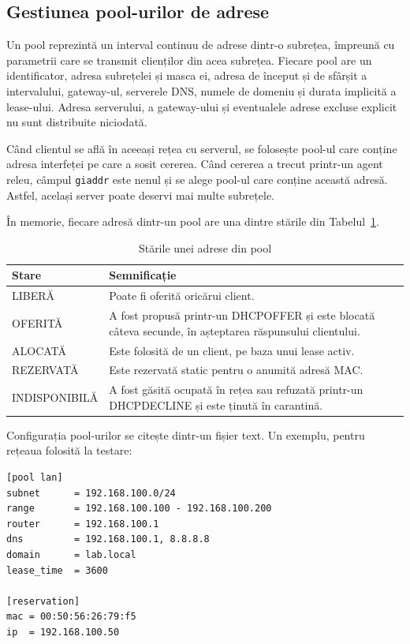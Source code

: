 \documentclass[conference]{IEEEtran}
\begin{document}
\subsection{Gestiunea pool-urilor de adrese}\label{subsec:pool}
Un pool reprezintă un interval continuu de adrese dintr-o subrețea, împreună cu parametrii care se transmit clienților din acea subrețea. Fiecare pool are un identificator, adresa subrețelei și masca ei, adresa de început și de sfârșit a intervalului, gateway-ul, serverele DNS, numele de domeniu și durata implicită a lease-ului. Adresa serverului, a gateway-ului și eventualele adrese excluse explicit nu sunt distribuite niciodată.

Când clientul se află în aceeași rețea cu serverul, se folosește pool-ul care conține adresa interfeței pe care a sosit cererea. Când cererea a trecut printr-un agent releu, câmpul \texttt{giaddr} este nenul și se alege pool-ul care conține această adresă. Astfel, același server poate deservi mai multe subrețele.

În memorie, fiecare adresă dintr-un pool are una dintre stările din Tabelul~\ref{tab:stari}.

\begin{table}[htbp]
\caption{Stările unei adrese din pool}
\begin{center}
\begin{tabular}{|l|p{5.2cm}|}
\hline
\textbf{Stare} & \textbf{Semnificație} \\
\hline
LIBERĂ & Poate fi oferită oricărui client. \\
\hline
OFERITĂ & A fost propusă printr-un DHCPOFFER și este blocată câteva secunde, în așteptarea răspunsului clientului. \\
\hline
ALOCATĂ & Este folosită de un client, pe baza unui lease activ. \\
\hline
REZERVATĂ & Este rezervată static pentru o anumită adresă MAC. \\
\hline
INDISPONIBILĂ & A fost găsită ocupată în rețea sau refuzată printr-un DHCPDECLINE și este ținută în carantină. \\
\hline
\end{tabular}
\label{tab:stari}
\end{center}
\end{table}

Configurația pool-urilor se citește dintr-un fișier text. Un exemplu, pentru rețeaua folosită la testare:
\begin{lstlisting}
[pool lan]
subnet      = 192.168.100.0/24
range       = 192.168.100.100 - 192.168.100.200
router      = 192.168.100.1
dns         = 192.168.100.1, 8.8.8.8
domain      = lab.local
lease_time  = 3600

[reservation]
mac = 00:50:56:26:79:f5
ip  = 192.168.100.50
\end{lstlisting}
\end{document}

